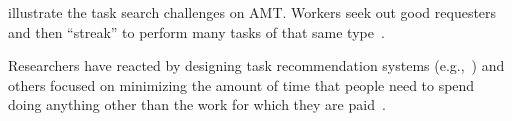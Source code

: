 \documentclass[trackingWork]{subfiles}
\begin{document}


\citeauthor{taskSearch} illustrate the task search challenges on AMT.%
Workers seek out good requesters~\cite{martin2014being} and then  ``streak'' to perform many tasks of that same type~\cite{taskSearch}.

Researchers have reacted by designing task recommendation systems (e.g.,~\cite{Cosley:2007:SUI:1216295.1216309})
and others focused on minimizing the amount of time that people need to spend doing anything other than the work for which they are paid~\cite{callison2014crowd}.
\end{document}
